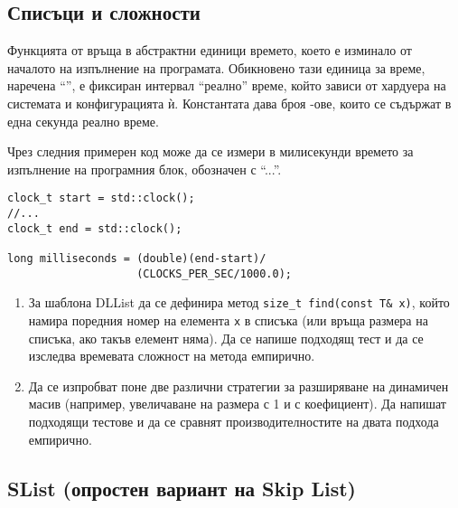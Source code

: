 \subsection {Списъци и сложности}
\label{timing}
\begin{mdframed}[hidealllines=true,backgroundcolor=gray!20]
Функцията  от  връща в абстрактни единици времето, което е изминало от началото на изпълнение на програмата. Обикновено тази единица за време, наречена ``'', е фиксиран интервал ``реално'' време, който зависи от хардуера на системата и конфигурацията ѝ. Константата  дава броя -ове, които се съдържат в една секунда реално време.

Чрез следния примерен код може да се измери в милисекунди времето за изпълнение на програмния блок, обозначен с ``...''.
\begin{verbatim}
clock_t start = std::clock();
//...
clock_t end = std::clock();

long milliseconds = (double)(end-start)/
                    (CLOCKS_PER_SEC/1000.0);

\end{verbatim}
\end{mdframed}

\begin{enumerate}[resume]

\item За шаблона DLList да се дефинира метод \texttt{size\_t find(const T\& x)}, който намира поредния номер на елемента \texttt{x} в списъка (или връща размера на списъка, ако такъв елемент няма). Да се напише подходящ тест и да се изследва времевата сложност на метода емпирично.

\item Да се изпробват поне две различни стратегии за разширяване на динамичен масив (например, увеличаване на размера с 1 и с коефициент). Да напишат подходящи тестове и да се сравнят производителностите на двата подхода емпирично.

\end{enumerate}


\subsection{SList (опростен вариант на Skip List)}

